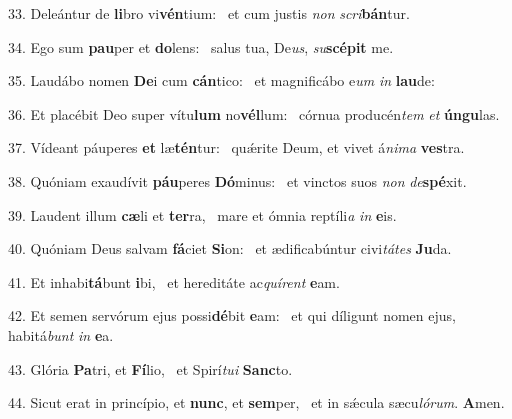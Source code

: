 33. Deleántur de \textbf{li}bro vi\textbf{vén}tium: \ast\  et cum justis \textit{non} \textit{scri}\textbf{bán}tur.\

34. Ego sum \textbf{pau}per et \textbf{do}lens: \ast\  salus tua, De\textit{us}, \textit{su}\textbf{scé}\textbf{pit} me.\

35. Laudábo nomen \textbf{De}i cum \textbf{cán}tico: \ast\  et magnificábo e\textit{um} \textit{in} \textbf{lau}de:\

36. Et placébit Deo super vítu\textbf{lum} no\textbf{vél}lum: \ast\  córnua producén\textit{tem} \textit{et} \textbf{ún}\textbf{gu}las.\

37. Vídeant páuperes \textbf{et} læ\textbf{tén}tur: \ast\  quǽrite Deum, et vivet á\textit{ni}\textit{ma} \textbf{ves}tra.\

38. Quóniam exaudívit \textbf{páu}peres \textbf{Dó}minus: \ast\  et vinctos suos \textit{non} \textit{de}\textbf{spé}xit.\

39. Laudent illum \textbf{cæ}li et \textbf{ter}ra, \ast\  mare et ómnia reptíli\textit{a} \textit{in} \textbf{e}is.\

40. Quóniam Deus salvam \textbf{fá}ciet \textbf{Si}on: \ast\  et ædificabúntur civi\textit{tá}\textit{tes} \textbf{Ju}da.\

41. Et inhabi\textbf{tá}bunt \textbf{i}bi, \ast\  et hereditáte ac\textit{quí}\textit{rent} \textbf{e}am.\

42. Et semen servórum ejus possi\textbf{dé}bit \textbf{e}am: \ast\  et qui díligunt nomen ejus, habitá\textit{bunt} \textit{in} \textbf{e}a.\

43. Glória \textbf{Pa}tri, et \textbf{Fí}lio, \ast\  et Spirí\textit{tu}\textit{i} \textbf{Sanc}to.\

44. Sicut erat in princípio, et \textbf{nunc}, et \textbf{sem}per, \ast\  et in sǽcula sæcu\textit{ló}\textit{rum}. \textbf{A}men.\


